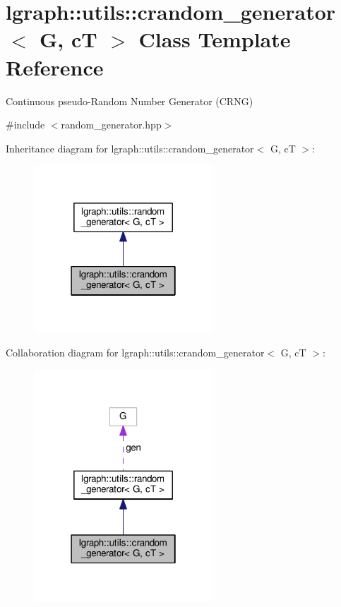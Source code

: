 \hypertarget{classlgraph_1_1utils_1_1crandom__generator}{}\section{lgraph\+:\+:utils\+:\+:crandom\+\_\+generator$<$ G, cT $>$ Class Template Reference}
\label{classlgraph_1_1utils_1_1crandom__generator}


Continuous pseudo-\/\+Random Number Generator (C\+R\+NG)  




{\ttfamily \#include $<$random\+\_\+generator.\+hpp$>$}



Inheritance diagram for lgraph\+:\+:utils\+:\+:crandom\+\_\+generator$<$ G, cT $>$\+:
\nopagebreak
\begin{figure}[H]
\begin{center}
\leavevmode
\includegraphics[width=190pt]{classlgraph_1_1utils_1_1crandom__generator__inherit__graph}
\end{center}
\end{figure}


Collaboration diagram for lgraph\+:\+:utils\+:\+:crandom\+\_\+generator$<$ G, cT $>$\+:
\nopagebreak
\begin{figure}[H]
\begin{center}
\leavevmode
\includegraphics[width=190pt]{classlgraph_1_1utils_1_1crandom__generator__coll__graph}
\end{center}
\end{figure}
